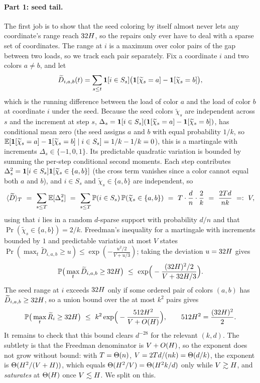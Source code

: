 \paragraph{Part 1: seed tail.}
The first job is to show that the seed coloring by itself almost never lets any coordinate's range reach $32H$, so the
repairs only ever have to deal with a sparse set of coordinates. The range at $i$ is a maximum over color pairs of the gap
between two loads, so we track each pair separately. Fix a coordinate $i$ and two colors $a\ne b$, and let
$$\widetilde D_{i,a,b}(t)=\sum_{s\le t}\mathbf{1}[i\in S_s]\big(\mathbf{1}[\widetilde\chi_s=a]-\mathbf{1}[\widetilde\chi_s=b]\big),$$
which is the running difference between the load of color $a$ and the load of color $b$ at coordinate $i$ under the seed.
Because the seed colors $\widetilde\chi_s$ are independent across $s$ and the increment at step $s$,
$\Delta_s=\mathbf{1}[i\in S_s](\mathbf{1}[\widetilde\chi_s=a]-\mathbf{1}[\widetilde\chi_s=b])$, has conditional mean zero (the seed assigns $a$ and
$b$ with equal probability $1/k$, so $\mathbb{E}[\mathbf{1}[\widetilde\chi_s=a]-\mathbf{1}[\widetilde\chi_s=b]\mid i\in S_s]=1/k-1/k=0$), this is a
martingale with increments $\Delta_s\in\{-1,0,1\}$. Its predictable quadratic variation is bounded by summing the per-step
conditional second moments. Each step contributes $\Delta_s^2=\mathbf{1}[i\in S_s]\mathbf{1}[\widetilde\chi_s\in\{a,b\}]$ (the cross term
vanishes since a color cannot equal both $a$ and $b$), and $i\in S_s$ and $\widetilde\chi_s\in\{a,b\}$ are independent, so
\[
  \langle\widetilde D\rangle_T\ =\ \sum_{s\le T}\mathbb{E}[\Delta_s^2]\ =\ \sum_{s\le T}\mathbb{P}(i\in S_s)\,\mathbb{P}(\widetilde\chi_s\in\{a,b\})
  \ =\ T\cdot\frac dn\cdot\frac2k\ =\ \frac{2Td}{nk}\ =:\ V,
\]
using that $i$ lies in a random $d$-sparse support with probability $d/n$ and that $\Pr(\widetilde\chi_s\in\{a,b\})=2/k$.
Freedman's inequality for a martingale with increments bounded by $1$ and predictable variation at most $V$ states
$\Pr(\max_t\widetilde D_{i,a,b}\ge u)\le\exp(-\tfrac{u^2/2}{V+u/3})$; taking the deviation
$u=32H$ gives
\[
  \Pr\big(\max_t\widetilde D_{i,a,b}\ge 32\Hscale\big)\ \le\ \exp\!\Big(-\frac{(32\Hscale)^2/2}{V+32\Hscale/3}\Big).
\]
The seed range at $i$ exceeds $32H$ only if some ordered pair of colors $(a,b)$ has $\widetilde D_{i,a,b}\ge 32H$,
so a union bound over the at most $k^2$ pairs gives
\[
  \Pr\big(\max_t\widetilde R_i\ge 32\Hscale\big)\ \le\ k^2\exp\!\Big(-\frac{512\Hscale^2}{V+\Oh(\Hscale)}\Big),
  \qquad 512\Hscale^2=\frac{(32\Hscale)^2}{2}.
\]
It remains to check that this bound clears $d^{-28}$ for the relevant $(k,d)$. The subtlety is that the Freedman denominator
is $V+O(H)$, so the exponent does not grow without bound: with $T=\Theta(n)$, $V=2Td/(nk)=\Theta(d/k)$, the exponent is
$\Theta(H^2/(V+H))$, which equals $\Theta(H^2/V)=\Theta(H^2 k/d)$ only while $V\gtrsim H$, and
\emph{saturates} at $\Theta(H)$ once $V\lesssim H$. We split on this.

